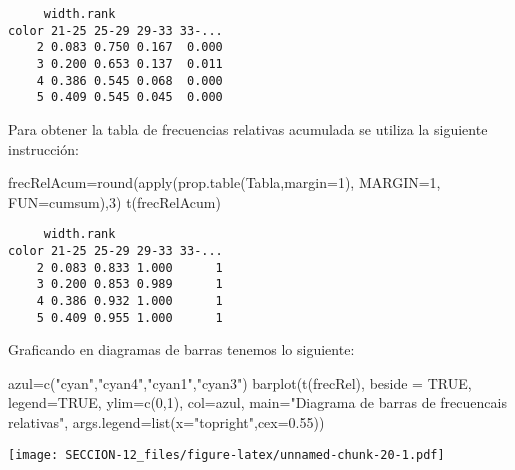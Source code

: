 \documentclass[
]{article}
\newenvironment{Shaded}{\begin{snugshade}}{\end{snugshade}}
\newcommand{\AttributeTok}[1]{\textcolor[rgb]{0.77,0.63,0.00}{#1}}
\newcommand{\ConstantTok}[1]{\textcolor[rgb]{0.00,0.00,0.00}{#1}}
\newcommand{\DecValTok}[1]{\textcolor[rgb]{0.00,0.00,0.81}{#1}}
\newcommand{\FloatTok}[1]{\textcolor[rgb]{0.00,0.00,0.81}{#1}}
\newcommand{\FunctionTok}[1]{\textcolor[rgb]{0.00,0.00,0.00}{#1}}
\newcommand{\NormalTok}[1]{#1}
\newcommand{\OtherTok}[1]{\textcolor[rgb]{0.56,0.35,0.01}{#1}}
\newcommand{\StringTok}[1]{\textcolor[rgb]{0.31,0.60,0.02}{#1}}
\begin{document}
\begin{verbatim}
     width.rank
color 21-25 25-29 29-33 33-...
    2 0.083 0.750 0.167  0.000
    3 0.200 0.653 0.137  0.011
    4 0.386 0.545 0.068  0.000
    5 0.409 0.545 0.045  0.000
\end{verbatim}

Para obtener la tabla de frecuencias relativas acumulada se utiliza la
siguiente instrucción:

\begin{Shaded}
\begin{Highlighting}[]
\NormalTok{frecRelAcum}\OtherTok{=}\FunctionTok{round}\NormalTok{(}\FunctionTok{apply}\NormalTok{(}\FunctionTok{prop.table}\NormalTok{(Tabla,}\AttributeTok{margin=}\DecValTok{1}\NormalTok{), }\AttributeTok{MARGIN=}\DecValTok{1}\NormalTok{, }\AttributeTok{FUN=}\NormalTok{cumsum),}\DecValTok{3}\NormalTok{)}
\FunctionTok{t}\NormalTok{(frecRelAcum)}
\end{Highlighting}
\end{Shaded}

\begin{verbatim}
     width.rank
color 21-25 25-29 29-33 33-...
    2 0.083 0.833 1.000      1
    3 0.200 0.853 0.989      1
    4 0.386 0.932 1.000      1
    5 0.409 0.955 1.000      1
\end{verbatim}

Graficando en diagramas de barras tenemos lo siguiente:

\begin{Shaded}
\begin{Highlighting}[]
\NormalTok{azul}\OtherTok{=}\FunctionTok{c}\NormalTok{(}\StringTok{"cyan"}\NormalTok{,}\StringTok{"cyan4"}\NormalTok{,}\StringTok{"cyan1"}\NormalTok{,}\StringTok{"cyan3"}\NormalTok{)}
\FunctionTok{barplot}\NormalTok{(}\FunctionTok{t}\NormalTok{(frecRel),}
        \AttributeTok{beside =} \ConstantTok{TRUE}\NormalTok{,}
        \AttributeTok{legend=}\ConstantTok{TRUE}\NormalTok{,}
        \AttributeTok{ylim=}\FunctionTok{c}\NormalTok{(}\DecValTok{0}\NormalTok{,}\DecValTok{1}\NormalTok{),}
        \AttributeTok{col=}\NormalTok{azul,}
        \AttributeTok{main=}\StringTok{"Diagrama de barras de frecuencais relativas"}\NormalTok{,}
        \AttributeTok{args.legend=}\FunctionTok{list}\NormalTok{(}\AttributeTok{x=}\StringTok{"topright"}\NormalTok{,}\AttributeTok{cex=}\FloatTok{0.55}\NormalTok{))}
\end{Highlighting}
\end{Shaded}

\texttt{[image: SECCION-12\_files/figure-latex/unnamed-chunk-20-1.pdf]}
\end{document}
